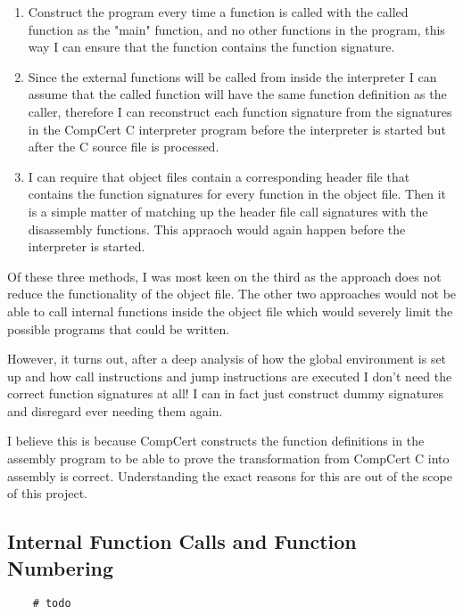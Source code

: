 \begin{enumerate}
    \item Construct the program every time a function is called with the called function as the "main" function,  and no other functions in the program, this way I can ensure that the function contains the function signature.
    \item Since the external functions will be called from inside the interpreter I can assume that the called function will have the same function definition as the caller, therefore I can reconstruct each function signature from the signatures in the CompCert C interpreter program before the interpreter is started but after the C source file is processed.
    \item I can require that object files contain a corresponding header file that contains the function signatures for every function in the object file. Then it is a simple matter of matching up the header file call signatures with the disassembly functions. This appraoch would again happen before the interpreter is started.
\end{enumerate}
Of these three methods, I was most keen on the third as the approach does not reduce the functionality of the object file. The other two approaches would not be able to call internal functions inside the object file which would severely limit the possible programs that could be written.

However, it turns out, after a deep analysis of how the global environment is set up and how call instructions and jump instructions are executed I don't need the correct function signatures at all! I can in fact just construct dummy signatures and disregard ever needing them again.

I believe this is because CompCert constructs the function definitions in the assembly program to be able to prove the transformation from CompCert C into assembly is correct. Understanding the exact reasons for this are out of the scope of this project.

\subsection{Internal Function Calls and Function Numbering}
\begin{verbatim}
    # todo
\end{verbatim}

